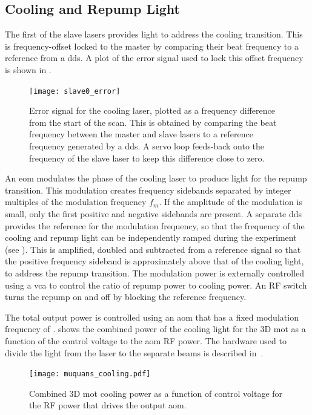 \subsection{Cooling and Repump Light}
The first of the slave lasers provides light to address the cooling
transition. This is
frequency-offset locked to the master by comparing their beat frequency to a
reference from a \ac{dds}. A plot of the error signal used to lock this offset
frequency is shown in .
\begin{figure}[!htbp]
	\centering
	\texttt{[image: slave0\_error]}
	\caption[Error Signal for the \Muquans\ Cooling laser.]{Error signal for the \Muquans cooling laser, plotted as a frequency difference from the start of the scan. This is obtained by comparing the beat frequency between the master and slave lasers to a reference frequency generated by a \ac{dds}. A servo loop feeds-back onto the frequency of the slave laser to keep this difference close to zero.}\label{fig:slave_offset}
\end{figure}
\par\noindent An \ac{eom} modulates the phase of the cooling laser to
produce light for the  repump transition. This modulation
creates frequency sidebands separated by integer multiples of the
modulation frequency
\(f_m\). If the amplitude of the modulation is small, only the first
positive and negative sidebands are present. A separate \ac{dds} provides the reference for the modulation frequency, so that the frequency of the cooling and repump
light can be independently ramped during the experiment (see
). This is amplified, doubled and subtracted
from a  reference signal so that the positive
frequency sideband is approximately  above that of the
cooling light, to address the repump transition. The modulation power is externally controlled using a \ac{vca} to control the ratio of
repump power to cooling power. An RF switch turns the repump on and off by blocking the reference frequency. \par\noindent The total output power is controlled using an
\ac{aom} that has a fixed modulation frequency of
.  shows
the combined power of the cooling light for the 3D \ac{mot} as a
function of the control voltage to the \ac{aom}
RF power. The hardware used to divide the light from the laser to the
separate beams is described in~.
\begin{figure}[htpb]
  \centering
  \texttt{[image: muquans\_cooling.pdf]}
  \caption[Cooling power vs. \ac{aom} control voltage.]{Combined
  3D \ac{mot} cooling power as a function of control voltage for the
  RF power that drives the
\Muquans output \ac{aom}.}
  \label{fig:muquans_cooling}
\end{figure}
